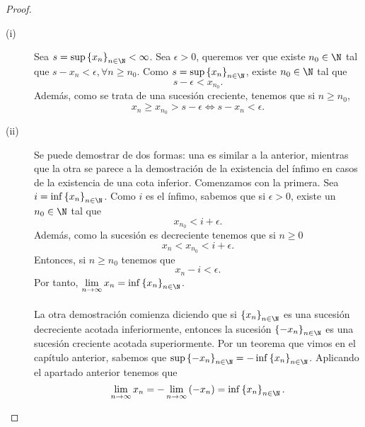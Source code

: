\begin{proof}
\begin{description}
	\item[(i)] Sea $\displaystyle s = \sup \left\{ x_{n}\right\} _{n\in\N} < \infty $. Sea $\displaystyle \epsilon > 0 $, queremos ver que existe $\displaystyle n_{0} \in \N $ tal que $\displaystyle s - x_{n} < \epsilon, \forall n\geq n_{0} $. Como $\displaystyle s = \sup \left\{ x_{n}\right\} _{n\in\N} $, existe $\displaystyle n_{0} \in \N $ tal que 
		\[s - \epsilon < x_{n_{0}} .\]
Además, como se trata de una sucesión creciente, tenemos que si $\displaystyle n \geq n_{0} $, 
\[ x_{n} \geq x_{n_{0}} > s - \epsilon \iff s-x_{n} < \epsilon  .\]
\item[(ii)] Se puede demostrar de dos formas: una es similar a la anterior, mientras que la otra se parece a la demostración de la existencia del ínfimo en casos de la existencia de una cota inferior. Comenzamos con la primera. Sea $\displaystyle i = \inf \left\{ x_{n}\right\} _{n\in\N} $. Como $\displaystyle i $ es el ínfimo, sabemos que si $\displaystyle \epsilon > 0 $, existe un $\displaystyle n_{0} \in \N $ tal que 
	\[x_{n_{0}} < i + \epsilon  .\]
Además, como la sucesión es decreciente tenemos que si $\displaystyle n \geq 0 $ 
\[x_{n} < x_{n_{0}} < i + \epsilon  .\]
Entonces, si $\displaystyle n \geq n_{0} $ tenemos que
\[ x_{n}-i < \epsilon  .\]
Por tanto, $\displaystyle \lim_{n \to \infty}x_{n} = \inf \left\{ x_{n}\right\} _{n\in\N} $. \\ \\
La otra demostración comienza diciendo que si $\displaystyle \left\{ x_{n}\right\} _{n\in\N} $ es una sucesión decreciente acotada inferiormente, entonces la sucesión $\displaystyle \left\{ -x_{n}\right\} _{n\in\N} $ es una sucesión creciente acotada superiormente. Por un teorema que vimos en el capítulo anterior, sabemos que $\displaystyle \sup \left\{ -x_{n}\right\} _{n\in\N} = -\inf \left\{ x_{n}\right\} _{n\in\N} $. Aplicando el apartado anterior tenemos que 
\[\lim_{n \to \infty} x_{n} =- \lim_{n \to \infty}\left(-x_{n}\right) = \inf \left\{ x_{n}\right\} _{n\in\N} .\]

\end{description}
\end{proof}

